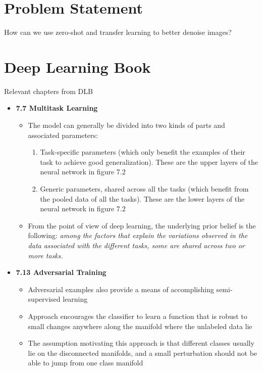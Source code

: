 \documentclass[12pt]{article}
\begin{document}
\section{Problem Statement}

How can we use zero-shot and transfer learning to
better denoise images? 

\section{Deep Learning Book}

Relevant chapters from DLB \cite{Goodfellow-et-al-2016}

\begin{itemize}
\item \textbf{7.7 Multitask Learning}
  \begin{itemize}
  \item The model can generally be divided into two kinds
    of parts and associated parameters:
    \begin{enumerate}
    \item Task-specific parameters (which only benefit the examples
      of their task to achieve good generalization). These are the
      upper layers of the neural network in figure 7.2
    \item Generic parameters, shared across all the tasks (which benefit
      from the pooled data of all the tasks). These are the lower
      layers of the neural network in figure 7.2
    \end{enumerate}
  \item From the point of view of deep learning, the underlying prior
    belief is the following: \textit{among the factors that explain the
      variations observed in the data associated with the different
      tasks, some are shared across two or more tasks.}
  \end{itemize}
\item \textbf{7.13 Adversarial Training}
  \begin{itemize}
  \item Adversarial examples also provide a means of accomplishing
    semi-supervised learning
  \item Approach encourages the classifier to learn a function that
    is robust to small changes anywhere along the manifold where
    the unlabeled data lie
  \item The assumption motivating this approach is that different
    classes usually lie on the disconnected manifolds, and a small
    perturbation should not be able to jump from one class manifold

\end{itemize}
\end{itemize}
\end{document}

